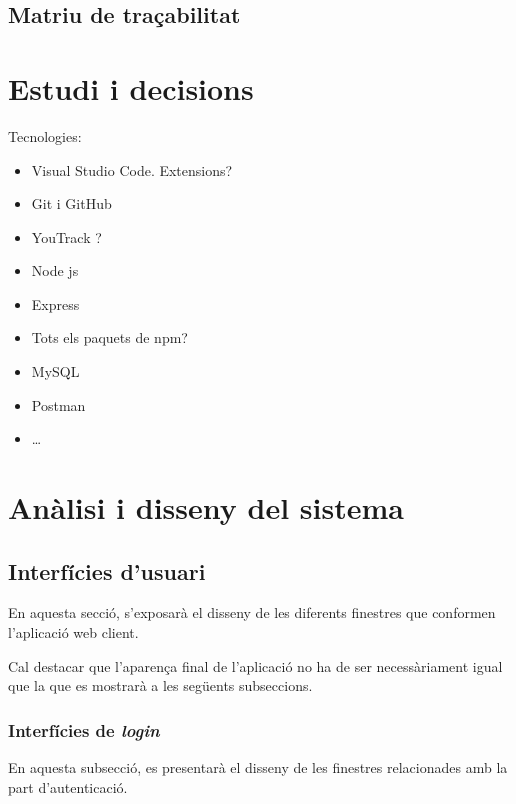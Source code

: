 \documentclass[a4paper,12pt]{ThesisStyle}
\begin{document}
\section{Matriu de traçabilitat}
\label{sec:matriu_tracabilitat}


\chapter{Estudi i decisions}
\label{cap:estudi}

Tecnologies:
\begin{itemize}
  \item Visual Studio Code. Extensions?
  \item Git i GitHub
  \item YouTrack ?
  \item Node js
  \item Express
  \item Tots els paquets de npm?
  \item MySQL
  \item Postman
  \item \ldots
\end{itemize}

\chapter{Anàlisi i disseny del sistema}
\label{cap:analisi}

\section{Interfícies d'usuari}
\label{sec:interficies_usuari}

En aquesta secció, s'exposarà el disseny de les diferents finestres que conformen l'aplicació web client.

Cal destacar que l'aparença final de l'aplicació no ha de ser necessàriament igual que la que es mostrarà a les següents subseccions.

\subsection{Interfícies de \textit{login}}
\label{subsec:interficies_login}

En aquesta subsecció, es presentarà el disseny de les finestres relacionades amb la part d'autenticació.
\end{document}
